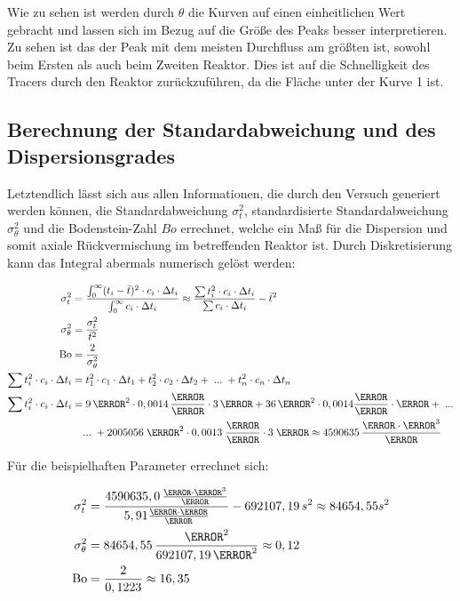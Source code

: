 \documentclass[12pt,liststotoc]{report}
\begin{document}
Wie zu sehen ist werden durch $\theta$ die Kurven auf einen einheitlichen Wert gebracht und lassen sich im Bezug auf die Größe des Peaks besser interpretieren. Zu sehen ist das der Peak mit dem meisten Durchfluss am größten ist, sowohl beim Ersten als auch beim Zweiten Reaktor. Dies ist auf die Schnelligkeit des Tracers durch den Reaktor zurückzuführen, da die Fläche unter der Kurve 1 ist.

\subsection{Berechnung der Standardabweichung und des Dispersionsgrades}

Letztendlich lässt sich aus allen Informationen, die durch den Versuch generiert werden können, die Standardabweichung $\sigma^{2}_t$, standardisierte Standardabweichung $\sigma^{2}_\theta$ und die Bodenstein-Zahl $Bo$ errechnet, welche ein Maß für die Dispersion und somit axiale Rückvermischung im betreffenden Reaktor ist. Durch Diskretisierung kann das Integral abermals numerisch gelöst werden:

\begin{align}
\sigma^{2}_t =&\;\frac{\int_{0}^{\infty}(t_i-\bar{t})^2\cdot c_i \cdot\Delta t_i}{\int_{0}^{\infty}c_i\cdot\Delta t_i} \approx \frac{\sum t_{i}^2\cdot c_i \cdot\Delta t_i}{\sum c_i\cdot\Delta t_i} - \bar{t}^2\\
\sigma_\theta^2 =&\;\frac{\sigma^{2}_t}{\bar{t}^2}\\
\text{Bo} =&\; \frac{2}{\sigma_\theta^2}\\
\sum t_{i}^2\cdot c_i \cdot\Delta t_i =&\; t_{1}^2\cdot c_1 \cdot\Delta t_1 + t_{2}^2\cdot c_2 \cdot\Delta t_2+\;...\;+t_{n}^2\cdot c_n \cdot\Delta t_n \\
\sum t_{i}^2\cdot c_i \cdot\Delta t_i =&\; 9\,\s^2\cdot 0,0014\,\frac{\mole}{\litre} \cdot 3\,\s + 36\,\s^2\cdot 0,0014\frac{\mole}{\litre} \cdot \s+\;...\nonumber\\\notag
&...\;+ 2005056\;\s^2\cdot 0,0013\;\frac{\mole}{\litre} \cdot 3\;\s \approx 4590635\,\frac{\mole \cdot \s^3}{\litre}\notag
\end{align}

Für die beispielhaften Parameter errechnet sich:

\begin{align*}
\sigma^{2}_t =&\;\frac{ 4590635,0\,\frac{\mole \cdot \s^3}{\litre}}{ 5,91\frac{\mole \cdot \s}{\litre}} - 692107,19
\,s^2\approx 84654,55
s^2\\
\sigma_\theta^2 =&\; 84654,55\,\frac{\s^2}{692107,19\,\s^2}\approx 0,12\\
\text{Bo} =&\; \frac{2}{0,1223}\approx 16,35
\end{align*}
\end{document}
